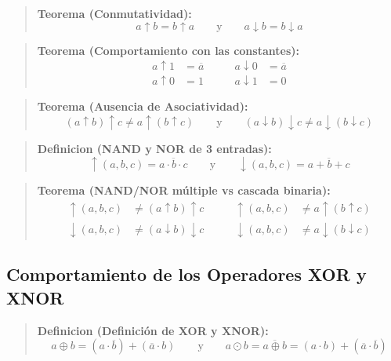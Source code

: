 \setcounter{tcb@cnt@teorema}{16}
\begin{quote}\textbf{Teorema (Conmutatividad):}\label{conmut_deriv_eng}
\[ a \uparrow b = b \uparrow a \qquad \text{y} \qquad a \downarrow b = b \downarrow a \]
\end{quote}

\setcounter{tcb@cnt@teorema}{18}
\begin{quote}\textbf{Teorema (Comportamiento con las constantes):}\label{constantes_deriv_eng}
\begin{align*}
    a \uparrow 1 &= \overline{a} \qquad & a \downarrow 0 &= \overline{a} \\
    a \uparrow 0 &= 1 \qquad & a \downarrow 1 &= 0
\end{align*}
\end{quote}

\setcounter{tcb@cnt@teorema}{19}
\begin{quote}\textbf{Teorema (Ausencia de Asociatividad):}\label{no_asoc_deriv_eng}
\[ (a \uparrow b) \uparrow c \neq a \uparrow (b \uparrow c) \qquad \text{y} \qquad (a \downarrow b) \downarrow c \neq a \downarrow (b \downarrow c) \]
\end{quote}

\setcounter{tcb@cnt@definicion}{6}
\begin{quote}\textbf{Definicion (NAND y NOR de 3 entradas):}\label{n_entradas_eng}
\[ \uparrow(a,b,c) = \overline{a \cdot b \cdot c} \qquad \text{y} \qquad \downarrow(a,b,c) = \overline{a + b + c} \]
\end{quote}

\setcounter{tcb@cnt@teorema}{20}
\begin{quote}\textbf{Teorema (NAND/NOR múltiple vs cascada binaria):}\label{multiple_vs_binaria_eng}
\begin{align*}
    \uparrow(a,b,c) &\neq (a \uparrow b) \uparrow c \qquad & \uparrow(a,b,c) &\neq a \uparrow (b \uparrow c) \\
    \downarrow(a,b,c) &\neq (a \downarrow b) \downarrow c \qquad & \downarrow(a,b,c) &\neq a \downarrow (b \downarrow c)
\end{align*}
\end{quote}
\subsection*{Comportamiento de los Operadores XOR y XNOR}

\setcounter{tcb@cnt@definicion}{4}
\begin{quote}\textbf{Definicion (Definición de XOR y XNOR):}\label{def_xor_xnor_eng}
\[ a \oplus b = (a \cdot \overline{b}) + (\overline{a} \cdot b) \qquad \text{y} \qquad a \odot b = \overline{a \oplus b} = (a \cdot b) + (\overline{a} \cdot \overline{b}) \]
\end{quote}

